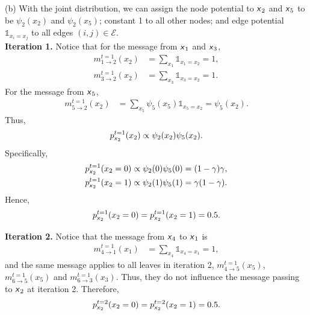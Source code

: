 \documentclass{article}
\newcommand{\s}[1]{\textsf{\textit{#1}}}
\begin{document}
\noindent
(b) 
With the joint distribution, we can assign the node potential to $\s{x}_2$
and $\s{x}_5$ to be $\psi_2(x_2)$ and $\psi_2(x_5)$; constant 1 to all other nodes;
and edge potential $\mathds{1}_{x_i = x_j}$ to all edges $(i, j) \in \mathscr{E}$.
%
\\

\noindent
\textbf{Iteration 1.} Notice that for the message from $\s{x}_1$ and $\s{x}_3$,
%
\begin{align*}
	m^{t=1}_{1\to2}(x_2) &= \sum_{x_1}\mathds{1}_{x_1 = x_2} = 1,\\
	m^{t=1}_{3\to2}(x_2) &= \sum_{x_3}\mathds{1}_{x_3 = x_2} = 1.
\end{align*}
%
For the message from $\s{x}_5$,
%
\begin{align*}
	m^{t=1}_{5\to2}(x_2) &=
	\sum_{x_5}\psi_5(x_5)\mathds{1}_{x_5 = x_2} = \psi_5(x_2).
\end{align*}
%
Thus,
%
\begin{align*}
	p^{t=1}_{\s{x}_2}(x_2) \propto \psi_2(x_2)\psi_5(x_2).
\end{align*}
%
Specifically,
%
\begin{align}
	p^{t=1}_{\s{x}_2}(x_2=0) \propto \psi_2(0)\psi_5(0) = (1 - \gamma)\gamma,\\
	p^{t=1}_{\s{x}_2}(x_2=1) \propto \psi_2(1)\psi_5(1) = \gamma(1 - \gamma).
\end{align}
%
Hence, 
\begin{align}
	p^{t=1}_{\s{x}_2}(x_2=0) = p^{t=1}_{\s{x}_2}(x_2=1) = 0.5.
\end{align}

\noindent
\textbf{Iteration 2.} Notice that the message from $\s{x}_4$ to $\s{x}_1$ is
%
\begin{align*}
	m^{t=1}_{4\to1}(x_1) &= \sum_{x_4}\mathds{1}_{x_4 = x_1} = 1,
\end{align*}
%
and the same message applies to all leaves in iteration 2, $m^{t=1}_{4\to5}(x_5)$,
$m^{t=1}_{6\to5}(x_5)$ and $m^{t=1}_{6\to3}(x_3)$.
%
Thus, they do not influence the message passing to $\s{x}_2$ at iteration 2.
%
Therefore,
%
\begin{align}
	p^{t=2}_{\s{x}_2}(x_2=0) = p^{t=2}_{\s{x}_2}(x_2=1) = 0.5.
\end{align}
\end{document}
